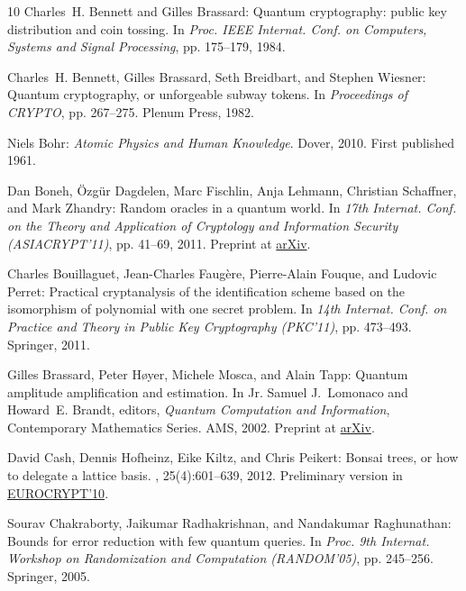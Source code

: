 \begin{thebibliography}{10}
{\sc Charles~H. Bennett and Gilles Brassard}: Quantum cryptography: public key
  distribution and coin tossing.
\newblock In {\em Proc. IEEE Internat. Conf. on Computers, Systems and Signal
  Processing}, pp. 175--179, 1984.

{\sc Charles~H. Bennett, Gilles Brassard, Seth Breidbart, and Stephen Wiesner}:
  Quantum cryptography, or unforgeable subway tokens.
\newblock In {\em Proceedings of CRYPTO}, pp. 267--275. Plenum Press, 1982.

{\sc Niels Bohr}: {\em Atomic Physics and Human Knowledge}.
\newblock Dover, 2010.
\newblock First published 1961.

{\sc Dan Boneh, \"{O}zg\"{u}r Dagdelen, Marc Fischlin, Anja Lehmann, Christian
  Schaffner, and Mark Zhandry}: Random oracles in a quantum world.
\newblock In {\em 17th Internat. Conf. on the Theory and Application of
  Cryptology and Information Security (ASIACRYPT'11)}, pp. 41--69, 2011.
\newblock Preprint at \href{http://arxiv.org/abs/1008.0931}{arXiv}.
\newblock [\epfmtdoi{10.1007/978-3-642-25385-0\_3}]

{\sc Charles Bouillaguet, Jean-Charles Faug\`{e}re, Pierre-Alain Fouque, and
  Ludovic Perret}: Practical cryptanalysis of the identification scheme based
  on the isomorphism of polynomial with one secret problem.
\newblock In {\em 14th Internat. Conf. on Practice and Theory in Public Key
  Cryptography (PKC'11)}, pp. 473--493. Springer, 2011.
\newblock [\epfmtdoi{10.1007/978-3-642-19379-8\_29}]

{\sc Gilles Brassard, Peter H{\o}yer, Michele Mosca, and Alain Tapp}: Quantum
  amplitude amplification and estimation.
\newblock In {\sc Jr. Samuel J.~Lomonaco and Howard~E. Brandt}, editors, {\em
  Quantum Computation and Information}, Contemporary Mathematics Series. AMS,
  2002.
\newblock Preprint at \href{http://arxiv.org/abs/quant-ph/0005055}{arXiv}.

{\sc David Cash, Dennis Hofheinz, Eike Kiltz, and Chris Peikert}: Bonsai trees,
  or how to delegate a lattice basis.
, 25(4):601--639, 2012.
\newblock Preliminary version in
  \href{http://dx.doi.org/10.1007/978-3-642-13190-5_27}{EUROCRYPT'10}.
\newblock [\epfmtdoi{10.1007/s00145-011-9105-2}]

{\sc Sourav Chakraborty, Jaikumar Radhakrishnan, and Nandakumar Raghunathan}:
  Bounds for error reduction with few quantum queries.
\newblock In {\em Proc. 9th Internat. Workshop on Randomization and Computation
  (RANDOM'05)}, pp. 245--256. Springer, 2005.
\newblock [\epfmtdoi{10.1007/11538462\_21}]


\end{thebibliography}
